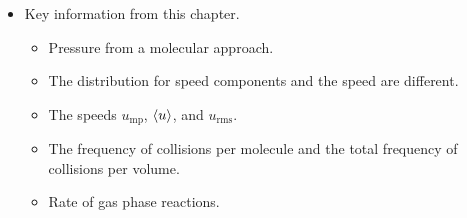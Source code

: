 \documentclass[../notes.tex]{subfiles}
\begin{document}
\begin{itemize}
    \item Key information from this chapter.
    \begin{itemize}
        \item Pressure from a molecular approach.
        \item The distribution for speed components and the speed are different.
        \item The speeds $u_\text{mp}$, $\left\langle{u}\right\rangle$, and $u_\text{rms}$.
        \item The frequency of collisions per molecule and the total frequency of collisions per volume.
        \item Rate of gas phase reactions.
    \end{itemize}
\end{itemize}
\end{document}
